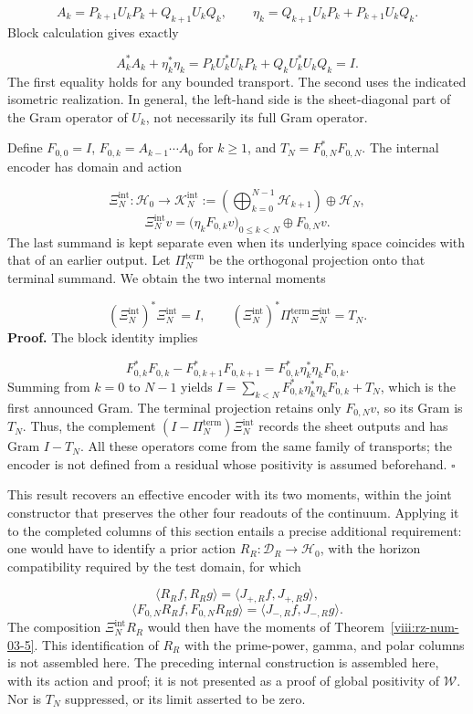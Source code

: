 \[
A_k=P_{k+1}U_kP_k+Q_{k+1}U_kQ_k,
\qquad
\eta_k=Q_{k+1}U_kP_k+P_{k+1}U_kQ_k.
\]
Block calculation gives exactly

\[
A_k^*A_k+\eta_k^*\eta_k
=P_kU_k^*U_kP_k+Q_kU_k^*U_kQ_k=I.
\]
The first equality holds for any bounded transport. The second uses the indicated isometric realization. In general, the left-hand side is the sheet-diagonal part of the Gram operator of \(U_k\), not necessarily its full Gram operator.

Define \(F_{0,0}=I\), \(F_{0,k}=A_{k-1}\cdots A_0\) for \(k\geq1\), and \(T_N=F_{0,N}^*F_{0,N}\). The internal encoder has domain and action

\[
\Xi_N^{\mathrm{int}}:\mathscr H_0\longrightarrow
\mathscr K_N^{\mathrm{int}}
:=\left(\bigoplus_{k=0}^{N-1}\mathscr H_{k+1}\right)\oplus\mathscr H_N,
\]
\[
\Xi_N^{\mathrm{int}}v
=\bigl(\eta_kF_{0,k}v\bigr)_{0\leq k<N}\oplus F_{0,N}v.
\]
The last summand is kept separate even when its underlying space coincides with that of an earlier output. Let \(\Pi_N^{\mathrm{term}}\) be the orthogonal projection onto that terminal summand. We obtain the two internal moments

\[
(\Xi_N^{\mathrm{int}})^*\Xi_N^{\mathrm{int}}=I,
\qquad
(\Xi_N^{\mathrm{int}})^*\Pi_N^{\mathrm{term}}\Xi_N^{\mathrm{int}}=T_N.
\]
\textbf{Proof.} The block identity implies

\[
F_{0,k}^*F_{0,k}-F_{0,k+1}^*F_{0,k+1}
=F_{0,k}^*\eta_k^*\eta_kF_{0,k}.
\]
Summing from \(k=0\) to \(N-1\) yields \(I=\sum_{k<N}F_{0,k}^*\eta_k^*\eta_kF_{0,k}+T_N\), which is the first announced Gram. The terminal projection retains only \(F_{0,N}v\), so its Gram is \(T_N\). Thus, the complement \((I-\Pi_N^{\mathrm{term}})\Xi_N^{\mathrm{int}}\) records the sheet outputs and has Gram \(I-T_N\). All these operators come from the same family of transports; the encoder is not defined from a residual whose positivity is assumed beforehand. \hfill\(\square\)

This result recovers an effective encoder with its two moments, within the joint constructor that preserves the other four readouts of the continuum. Applying it to the completed columns of this section entails a precise additional requirement: one would have to identify a prior action \(R_R:\mathcal D_R\to\mathscr H_0\), with the horizon compatibility required by the test domain, for which

\[
\langle R_Rf,R_Rg\rangle
=\langle J_{+,R}f,J_{+,R}g\rangle,
\]
\[
\langle F_{0,N}R_Rf,F_{0,N}R_Rg\rangle
=\langle J_{-,R}f,J_{-,R}g\rangle.
\]
The composition \(\Xi_N^{\mathrm{int}}R_R\) would then have the moments of Theorem~\ref{viii:rz-num-03-5}. This identification of \(R_R\) with the prime-power, gamma, and polar columns is not assembled here. The preceding internal construction is assembled here, with its action and proof; it is not presented as a proof of global positivity of \(\mathscr W\). Nor is \(T_N\) suppressed, or its limit asserted to be zero.

